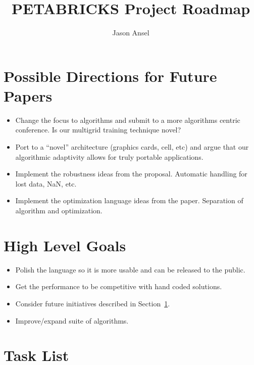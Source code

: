 \documentclass[11pt]{article}
\begin{document}
\title{PETABRICKS Project Roadmap}
\author{Jason Ansel}
\maketitle
\tableofcontents


\section{Possible Directions for Future Papers}
\label{future}
\begin{itemize}

\item Change the focus to algorithms and submit to a more algorithms
    centric conference.  Is our multigrid training technique novel?

\item Port to a ``novel'' architecture (graphics cards, cell, etc)
    and argue that our algorithmic adaptivity allows for truly portable
    applications.

\item Implement the robustness ideas from the proposal. Automatic handling
    for lost data, NaN, etc.

\item Implement the optimization language ideas from the paper.
    Separation of algorithm and optimization.

\end{itemize}

\section{High Level Goals}
\begin{itemize}

\item Polish the language so it is more usable and can be released to
the public.

\item Get the performance to be competitive with hand coded solutions.

\item Consider future initiatives described in Section~\ref{future}.

\item Improve/expand suite of algorithms.

\end{itemize}

\section{Task List}
\end{document}
